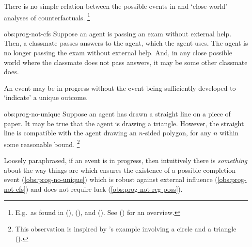 \begin{note}
  \begin{observation}%
    \label{obs:prog-not-cfs}%
    There is no simple relation between the possible events in \assuPP{} and `close-world' analyses of counterfactuals.%
    \footnote{
      E.g.\ as found in (\cite{Todd:1964aa}), (\cite{Stalnaker:1968vt}), and (\cite{Lewis:1973th}).
      See (\cite[\S2]{Starr:2022aa}) for an overview.
    }
  \end{observation}
  \begin{motivation}{obs:prog-not-cfs}
    Suppose an agent is passing an exam without external help.
    Then, a classmate passes answers to the agent, which the agent uses.
    The agent is no longer passing the exam without external help.
    And, in any close possible world where the classmate does not pass answers, it may be some other classmate does.
  \end{motivation}

  \begin{observation}%
    \label{obs:prog-no-unique}%
    An event may be in progress without the event being sufficiently developed to `indicate' a unique outcome.\newline
  \end{observation}
  \begin{motivation}{obs:prog-no-unique}
    Suppose an agent has drawn a straight line on a piece of paper.
    It may be true that the agent is drawing a triangle.
    However, the straight line is compatible with the agent drawing an \(n\)-sided polygon, for any \(n\) within some reasonable bound.%
    \footnote{
      This observation is inspired by \citeauthor{Dowty:1979vq}'s example involving a circle and a triangle (\citeyear[133]{Dowty:1979vq}).
    }
  \end{motivation}

  \noindent%
  Loosely paraphrased, if an event is in progress, then intuitively there is \emph{something} about the way things are which ensures the existence of a possible completion event (\autoref{obs:prog-no-unique}) which is robust against external influence (\autoref{obs:prog-not-cfs}) and does not require luck (\autoref{obs:prog-not-reg-poss}).
\end{note}


